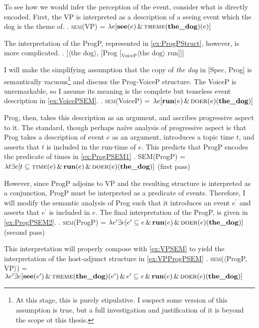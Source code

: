 \documentclass[MilwayThesis]{subfiles}
\begin{document}
To see how we would infer the perception of the event, consider what is directly encoded.
First, the VP is interpreted as a description of a seeing event which the dog is the theme of.
\ex.\label{ex:VPSEM} \textsc{sem}(VP) = $\lambda e [\textbf{see}(e)\,\&\,\textsc{theme}(\textbf{the\_dog})(e)]$

The interpretation of the ProgP, represented in \cref{ex:ProgPStruct}, however, is more complicated.
\ex.\label{ex:ProgPStruct} [$\langle$the dog$\rangle$, [Prog [$_\text{VoiceP} \langle\text{the dog}\rangle$ run]]]

I will make the simplifying assumption that the copy of \textit{the dog} in [Spec, Prog] is semantically vacuous\footnote{
	At this stage, this is purely stipulative.
	I suspect some version of this assumption is true, but a full investigation and justification of it is beyond the scope ot this thesis.
} and discuss the Prog-VoiceP structure.
The VoiceP is unremarkable, so I assume its meaning is the complete but tenseless event description in \cref{ex:VoicePSEM}.
\ex.\label{ex:VoicePSEM} \textsc{sem}(VoiceP) = $\lambda e [\textbf{run}(e)\,\&\,\textsc{doer}(e)(\textbf{the\_dog})]$

Prog, then, takes this description as an argument, and ascribes progressive aspect to it.
The standard, though perhaps na\"ive analysis of progressive aspect is that Prog takes a description of event $e$ as an argument, introduces a topic time $t$, and asserts that $t$ is included in the run-time of $e$.
This predicts that ProgP encodes the predicate of times in \cref{ex:ProgPSEM1}
\ex.\label{ex:ProgPSEM1} \textsc{SEM}(ProgP) =  $\lambda t \exists e [t \subseteq \textsc{time}(e)\,\&\,\textbf{run}(e)\,\&\,\textsc{doer}(e)(\textbf{the\_dog})]$ (first pass)

However, since ProgP adjoins to VP and the resulting structure is interpreted as a conjunction, ProgP must be interpreted as a predicate of events.
Therefore, I will modify the semantic analysis of Prog such that it introduces an event $e^{\prime}$ and asserts that $e^{\prime}$ is included in $e$.
The final interpretation of the ProgP, is given in \cref{ex:ProgPSEM2}.
\ex.\label{ex:ProgPSEM2} \textsc{sem}(ProgP) =  $\lambda e^{\prime} \exists e [e^{\prime} \subseteq e\,\&\,\textbf{run}(e)\,\&\,\textsc{doer}(e)(\textbf{the\_dog})]$ (second pass)

This interpretation will properly compose with \cref{ex:VPSEM} to yield the interpretation of the host-adjunct structure in \cref{ex:VPProgPSEM}
\ex.\label{ex:VPProgPSEM} \textsc{sem}($\langle$ProgP, VP$\rangle$) = $\lambda e^{\prime} \exists e [ \textbf{see}(e^{\prime})\,\&\,\textsc{theme}(\textbf{the\_dog})(e^{\prime})\,\&\,e^{\prime} \subseteq e\,\&\,\textbf{run}(e)\,\&\,\textsc{doer}(e)(\textbf{the\_dog})]$
\end{document}
